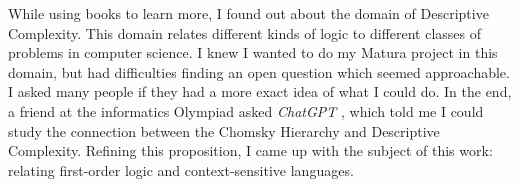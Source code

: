 While using books to learn more, I found out about the domain of Descriptive Complexity.
This domain relates different kinds of logic to different classes of problems in computer science.
I knew I wanted to do my Matura project in this domain, but had difficulties finding an open question which seemed approachable.
I asked many people if they had a more exact idea of what I could do.
In the end, a friend at the informatics Olympiad asked \emph{ChatGPT} \cite{chatgpt}, which told me I could study the connection between the Chomsky Hierarchy and Descriptive Complexity.
Refining this proposition, I came up with the subject of this work: relating first-order logic and context-sensitive languages.



